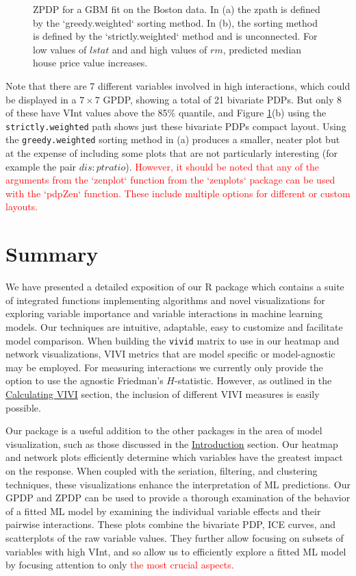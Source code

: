 \begin{figure}
{}

\caption{ZPDP for a GBM fit on the Boston data. In (a) the zpath is defined by the `greedy.weighted` sorting method. In (b), the sorting method is defined by the `strictly.weighted` method and is unconnected. For low values of $lstat$ and and high values of $rm$, predicted median house price value increases.}\label{fig:zpdpGBM}
\end{figure}

Note that there are 7 different variables involved in high interactions, which could be displayed in a \(7 \times 7\) GPDP, showing a total of 21 bivariate PDPs. But only 8 of these have VInt values above the 85\% quantile, and Figure \ref{fig:zpdpGBM}(b) using the \texttt{strictly.weighted} path shows just these bivariate PDPs compact layout. Using the \texttt{greedy.weighted} sorting method in (a) produces a smaller, neater plot but at the expense of including some plots that are not particularly interesting (for example the pair \(dis:ptratio\)). \textcolor{red}{However, it should be noted that any of the arguments from the `zenplot` function from the `zenplots` package can be used with the `pdpZen` function. These include multiple options for different or custom layouts.}

\hypertarget{summary}{%
\section{Summary}\label{summary}}

We have presented a detailed exposition of our R package  which contains a suite of integrated functions implementing algorithms and novel visualizations for exploring variable importance and variable interactions in machine learning models. Our techniques are intuitive, adaptable, easy to customize and facilitate model comparison. When building the \texttt{vivid} matrix to use in our heatmap and network visualizations, VIVI metrics that are model specific or model-agnostic may be employed. For measuring interactions we currently only provide the option to use the agnostic Friedman's \(H\)-statistic. However, as outlined in the \protect\hyperlink{data}{Calculating VIVI} section, the inclusion of different VIVI measures is easily possible.

Our  package is a useful addition to the other packages in the area of model visualization, such as those discussed in the \protect\hyperlink{introduction}{Introduction} section. Our heatmap and network plots efficiently determine which variables have the greatest impact on the response. When coupled with the seriation, filtering, and clustering techniques, these visualizations enhance the interpretation of ML predictions. Our GPDP and ZPDP can be used to provide a thorough examination of the behavior of a fitted ML model by examining the individual variable effects and their pairwise interactions. These plots combine the bivariate PDP, ICE curves, and scatterplots of the raw variable values. They further allow focusing on subsets of variables with high VInt, and so allow us to efficiently explore a fitted ML model by focusing attention to only \textcolor{red}{the most crucial aspects.}

